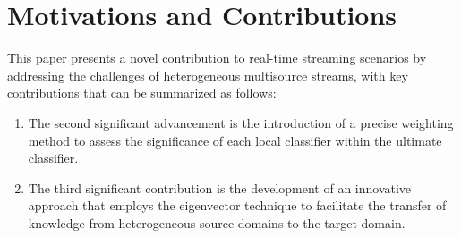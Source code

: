 \section{Motivations and Contributions} \label{sec:4_2_motivation}
This paper presents a novel contribution to real-time streaming scenarios by addressing the challenges of heterogeneous multisource streams, with key contributions that can be summarized as follows:
\begin{enumerate}[nosep]
  \itemThe primary innovation involves incorporating a concept drift detection method in conjunction with an ensemble classifier, enabling real-time adaptation and refinement of the proposed approach in response to transfer learning in non-stationary environments. This methodology ensures continuous evolution of the classification model in accordance with the changing data landscape.
  \item The second significant advancement is the introduction of a precise weighting method to assess the significance of each local classifier within the ultimate classifier.
 \item The third significant contribution is the development of an innovative approach that employs the eigenvector technique to facilitate the transfer of knowledge from heterogeneous source domains to the target domain.
  \end{enumerate} 
 
   

